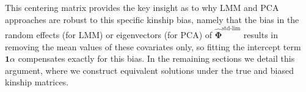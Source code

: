 \documentclass[11pt]{article}
\newcommand{\kinMat}{%
  \ensuremath{%
    \mathbf{\Phi}
  }%
  \xspace%
}%
\newcommand{\kinMatStdLim}{%
  \ensuremath{%
    \mathbf{\hat{\Phi}}^\text{std-lim}
  }%
  \xspace%
}%
\begin{document}
This centering matrix provides the key insight as to why LMM and PCA approaches are robust to this specific kinship bias, namely that the bias in the random effects (for LMM) or eigenvectors (for PCA) of \kinMatStdLim results in removing the mean values of these covariates only, so fitting the intercept term $\mathbf{1} \alpha$ compensates exactly for this bias.
In the remaining sections we detail this argument, where we construct equivalent solutions under the true and biased kinship matrices.






  
  
\end{document}
